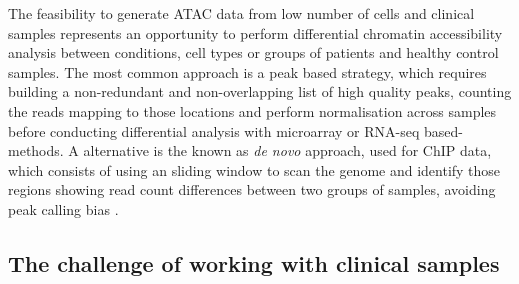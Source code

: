 The feasibility to generate ATAC data from low number of cells and clinical samples represents an opportunity to perform differential chromatin accessibility analysis between conditions, cell types or groups of patients and healthy control samples. The most common approach is a peak based strategy, which requires building a non-redundant and non-overlapping list of high quality peaks, counting the reads mapping to those locations and perform normalisation across samples before conducting differential analysis with microarray or RNA-seq based-methods. A alternative is the known as \textit{de novo} approach, used for ChIP data, which consists of using an sliding window to scan the genome and identify those regions showing read count differences between two groups of samples, avoiding peak calling bias \parencite{Shen2013}.     

\subsection{The challenge of working with clinical samples}

